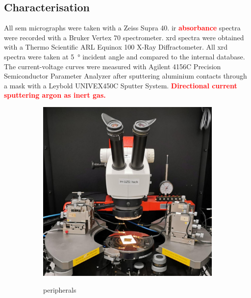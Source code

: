 \documentclass[a4paper]{article}
\newcommand{\td}[1]{\textbf{\textcolor{red}{#1}}}
\begin{document}
\subsection{Characterisation}
All \gls{sem} micrographs were taken with a Zeiss Supra 40. 
\Gls{ir} \td{absorbance} spectra were recorded with a Bruker Vertex 70 spectrometer.
\Gls{xrd} spectra were obtained with a Thermo Scientific ARL Equinox 100 X-Ray Diffractometer. 
All \gls{xrd} spectra were taken at \SI{5}{\degree} incident angle and compared to the internal database.
The current-voltage curves were measured with Agilent 4156C Precision Semiconductor Parameter Analyzer after sputtering aluminium contacts through a mask with a Leybold UNIVEX450C Sputter System.
\td{Directional current sputtering argon as inert gas.}
\begin{figure}
	\centering
	\begin{subfigure}{0.48\textwidth}
		\centering
		\includegraphics[width=.9\textwidth]{Pics/i-v.png}
		\label{fig:iv-agilent}
		\caption{peripherals}
	\end{subfigure}
	\begin{subfigure}{0.48\textwidth}
		\centering

\end{subfigure}
\end{figure}
\end{document}
